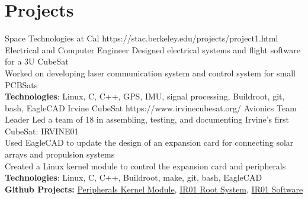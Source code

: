 \documentclass[10pt]{article} %
\begin{document}

\section{Projects}

{Space Technologies at Cal}
{https://stac.berkeley.edu/projects/project1.html}
{Electrical and Computer Engineer}
{
Designed electrical systems and flight software for a 3U CubeSat \\
Worked on developing laser communication system and control system for small PCBSats \\[5pt]
\textbf{Technologies}: Linux, C, C++, GPS, IMU, signal processing, Buildroot, git, bash, EagleCAD
}
{Irvine CubeSat}
{https://www.irvinecubesat.org/}
{Avionics Team Leader}
{
Led a team of 18 in assembling, testing, and documenting Irvine's first CubeSat: IRVINE01 \\
Used EagleCAD to update the design of an expansion card for connecting solar arrays and propulsion systems \\
Created a Linux kernel module to control the expansion card and peripherals \\[5pt]
\textbf{Technologies}: Linux, C, C++, Buildroot, make, git, bash, EagleCAD \\
\textbf{Github Projects:}
	\href{https://github.com/mark64/ccardmodule}{Peripherals Kernel Module},
	\href{https://github.com/mark64/buildroot}{IR01 Root System},
	\href{https://github.com/irvinecubesat/irvine-01-sw}{IR01 Software}
}



\end{document}
